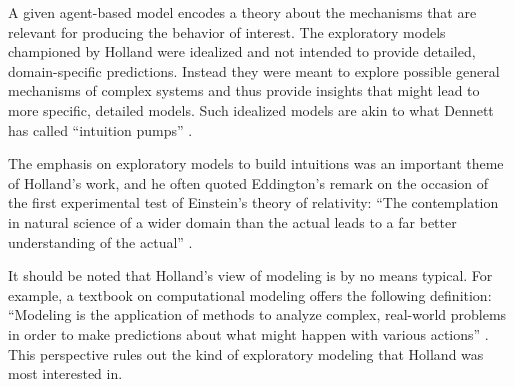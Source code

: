 \documentclass{sig-alternate}
\begin{document}
A given agent-based model encodes a theory about the mechanisms that
are relevant for producing the behavior of interest.  
The exploratory models
championed by Holland were idealized and not intended to provide detailed, domain-specific
predictions.  Instead they were meant to explore possible general
mechanisms of complex systems and thus provide insights that might
lead to more specific, detailed models.  Such idealized models are
akin to what Dennett has called ``intuition pumps''
\cite{Dennett1984}.

The emphasis on exploratory models to build intuitions was an
important theme of Holland's work, and he often quoted Eddington's
remark on the occasion of the first experimental test of Einstein's
theory of relativity: ``The contemplation in natural science of a wider
domain than the actual leads to a far better understanding of the
actual'' \cite{Eddington1927}.

It should be noted that Holland's view of modeling is by no means
typical.  For example, a textbook on computational modeling offers
 the following definition: ``Modeling is the application
of methods to analyze complex, real-world problems in order to make
predictions about what might happen with various actions''
\cite{Shiflet2014}.   This perspective rules out the
kind of exploratory modeling that Holland was most interested in. 



\end{document}
